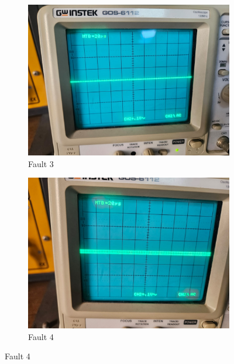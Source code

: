 \documentclass[a4paper,12pt]{article}
\begin{document}
\begin{figure}[H]
	\begin{subfigure}[t]{0.44\textwidth}
		\centering
		\includegraphics[width=1\linewidth]{Images/1.3}
		\caption{Fault 3}
		\vspace{0.1cm}
	\end{subfigure}
	\hfil
	\begin{subfigure}[t]{0.44\textwidth}
		\centering
		\includegraphics[width=1\linewidth]{Images/1.4}
		\caption{Fault 4}
		\vspace{0.1cm}
	\end{subfigure}
	

\end{figure}
\end{document}
